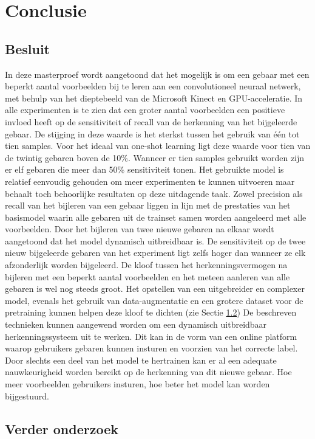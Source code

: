 \chapter{Conclusie}
\section{Besluit}
In deze masterproef wordt aangetoond dat het mogelijk is om een gebaar met een beperkt aantal voorbeelden bij te leren aan een convolutioneel neuraal netwerk, met behulp van het dieptebeeld van de Microsoft Kinect en GPU-acceleratie.
\npar In alle experimenten is te zien dat een groter aantal voorbeelden een positieve invloed heeft op de sensitiviteit of recall van de herkenning van het bijgeleerde gebaar. De stijging in deze waarde is het sterkst tussen het gebruik van \'e\'en tot tien samples. Voor het ideaal van one-shot learning ligt deze waarde voor tien van de twintig gebaren boven de 10\%. Wanneer er tien samples gebruikt worden zijn er elf gebaren die meer dan 50\% sensitiviteit tonen. Het gebruikte model is relatief eenvoudig gehouden om meer experimenten te kunnen uitvoeren maar behaalt toch behoorlijke resultaten op deze uitdagende taak.
\npar Zowel precision als recall van het bijleren van een gebaar liggen in lijn met de prestaties van het basismodel waarin alle gebaren uit de trainset samen worden aangeleerd met alle voorbeelden. 
\npar Door het bijleren van twee nieuwe gebaren na elkaar wordt aangetoond dat het model dynamisch uitbreidbaar is. De sensitiviteit op de twee nieuw bijgeleerde gebaren van het experiment ligt zelfs hoger dan wanneer ze elk afzonderlijk worden bijgeleerd.
\npar De kloof tussen het herkenningsvermogen na bijleren met een beperkt aantal voorbeelden en het meteen aanleren van alle gebaren is wel nog steeds groot. Het opstellen van een uitgebreider en complexer model, evenals het gebruik van data-augmentatie en een grotere dataset voor de pretraining kunnen helpen deze kloof te dichten (zie Sectie \ref{sec:verder})
\npar De beschreven technieken kunnen aangewend worden om een dynamisch uitbreidbaar herkenningssysteem uit te werken. Dit kan in de vorm van een online platform waarop gebruikers gebaren kunnen insturen en voorzien van het correcte label. Door slechts een deel van het model te hertrainen kan er al een adequate nauwkeurigheid worden bereikt op de herkenning van dit nieuwe gebaar. Hoe meer voorbeelden gebruikers insturen, hoe beter het model kan worden bijgestuurd.

\section{Verder onderzoek}\label{sec:verder}

